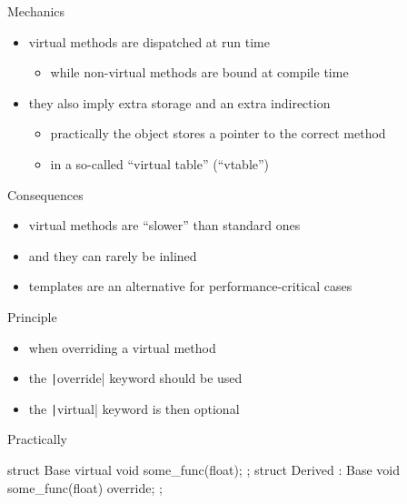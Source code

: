 \begin{frame}[fragile]
  \begin{block}{Mechanics}
    \begin{itemize}
    \item virtual methods are dispatched at run time
      \begin{itemize}
      \item while non-virtual methods are bound at compile time
      \end{itemize}
    \item they also imply extra storage and an extra indirection
      \begin{itemize}
      \item practically the object stores a pointer to the correct method
      \item in a so-called ``virtual table'' (``vtable'')
      \end{itemize}
    \end{itemize}
  \end{block}
  \begin{alertblock}{Consequences}
    \begin{itemize}
    \item virtual methods are ``slower'' than standard ones
    \item and they can rarely be inlined
    \item templates are an alternative for performance-critical cases
    \end{itemize}
  \end{alertblock}
\end{frame}

\begin{frame}[fragile]
  \begin{block}{Principle}
    \begin{itemize}
    \item when overriding a virtual method
    \item the \texttt|override| keyword should be used
    \item the \texttt|virtual| keyword is then optional
    \end{itemize}
  \end{block}
  \begin{exampleblock}{Practically}
    \begin{cppcode}
      struct Base {
        virtual void some_func(float);
      };
      struct Derived : Base {
        void some_func(float) override;
      };
    \end{cppcode}
  \end{exampleblock}
\end{frame}

